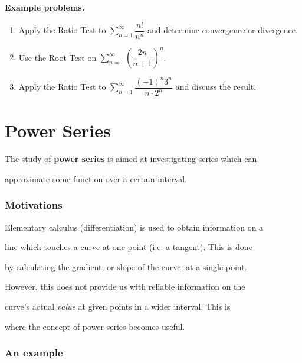 \textbf{Example problems.}

\begin{enumerate}
    \item Apply the Ratio Test to $\sum_{n=1}^{\infty}\dfrac{n!}{n^n}$ and determine convergence or divergence.
    \item Use the Root Test on $\sum_{n=1}^{\infty}\left(\dfrac{2n}{n+1}\right)^n$.
    \item Apply the Ratio Test to $\sum_{n=1}^{\infty}\dfrac{(-1)^n 3^n}{n\cdot 2^n}$ and discuss the result.
\end{enumerate}

\section{Power Series}
\label{sec:power-series}

The study of \textbf{power series} is aimed at investigating series which can

approximate some function over a certain interval.


\subsubsection{Motivations}
\label{sss:moti-f8c2}


Elementary calculus (differentiation) is used to obtain information on a

line which touches a curve at one point (i.e. a tangent). This is done

by calculating the gradient, or slope of the curve, at a single point.

However, this does not provide us with reliable information on the

curve's actual \textit{value} at given points in a wider interval. This is

where the concept of power series becomes useful.


\subsubsection{An example}
\label{sss:anex-9765}


